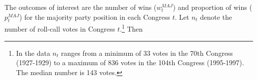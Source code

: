 %
%
%
%
%
%
%
%



The outcomes of interest are the number of wins ($w_t^{MAJ}$) and proportion of wins ($p_t^{MAJ}$) for the majority party position in each Congress $t$. Let $n_t$ denote the number of roll-call votes in Congress $t$.\footnote{In the data $n_t$ ranges from a minimum of 33 votes in the 70th Congress (1927-1929) to a maximum of 836 votes in the 104th Congress (1995-1997). The median number is 143 votes.}  Then

